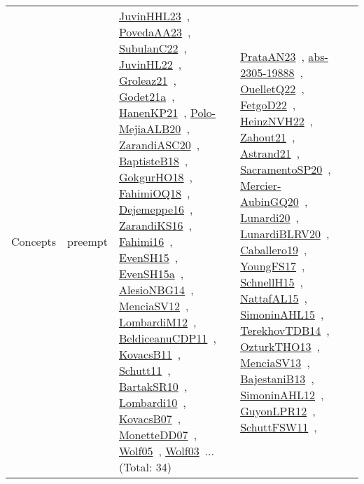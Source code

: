 {\begin{longtable}{lp{3cm}>{\raggedright\arraybackslash}p{6cm}>{\raggedright\arraybackslash}p{6cm}>{\raggedright\arraybackslash}p{8cm}}
Concepts & preempt & \href{works/JuvinHHL23.pdf}{JuvinHHL23}~\cite{JuvinHHL23}, \href{works/PovedaAA23.pdf}{PovedaAA23}~\cite{PovedaAA23}, \href{works/SubulanC22.pdf}{SubulanC22}~\cite{SubulanC22}, \href{works/JuvinHL22.pdf}{JuvinHL22}~\cite{JuvinHL22}, \href{works/Groleaz21.pdf}{Groleaz21}~\cite{Groleaz21}, \href{works/Godet21a.pdf}{Godet21a}~\cite{Godet21a}, \href{works/HanenKP21.pdf}{HanenKP21}~\cite{HanenKP21}, \href{works/Polo-MejiaALB20.pdf}{Polo-MejiaALB20}~\cite{Polo-MejiaALB20}, \href{works/ZarandiASC20.pdf}{ZarandiASC20}~\cite{ZarandiASC20}, \href{works/BaptisteB18.pdf}{BaptisteB18}~\cite{BaptisteB18}, \href{works/GokgurHO18.pdf}{GokgurHO18}~\cite{GokgurHO18}, \href{works/FahimiOQ18.pdf}{FahimiOQ18}~\cite{FahimiOQ18}, \href{works/Dejemeppe16.pdf}{Dejemeppe16}~\cite{Dejemeppe16}, \href{works/ZarandiKS16.pdf}{ZarandiKS16}~\cite{ZarandiKS16}, \href{works/Fahimi16.pdf}{Fahimi16}~\cite{Fahimi16}, \href{works/EvenSH15.pdf}{EvenSH15}~\cite{EvenSH15}, \href{works/EvenSH15a.pdf}{EvenSH15a}~\cite{EvenSH15a}, \href{works/AlesioNBG14.pdf}{AlesioNBG14}~\cite{AlesioNBG14}, \href{works/MenciaSV12.pdf}{MenciaSV12}~\cite{MenciaSV12}, \href{works/LombardiM12.pdf}{LombardiM12}~\cite{LombardiM12}, \href{works/BeldiceanuCDP11.pdf}{BeldiceanuCDP11}~\cite{BeldiceanuCDP11}, \href{works/KovacsB11.pdf}{KovacsB11}~\cite{KovacsB11}, \href{works/Schutt11.pdf}{Schutt11}~\cite{Schutt11}, \href{works/BartakSR10.pdf}{BartakSR10}~\cite{BartakSR10}, \href{works/Lombardi10.pdf}{Lombardi10}~\cite{Lombardi10}, \href{works/KovacsB07.pdf}{KovacsB07}~\cite{KovacsB07}, \href{works/MonetteDD07.pdf}{MonetteDD07}~\cite{MonetteDD07}, \href{works/Wolf05.pdf}{Wolf05}~\cite{Wolf05}, \href{works/Wolf03.pdf}{Wolf03}~\cite{Wolf03}... (Total: 34) & \href{works/PrataAN23.pdf}{PrataAN23}~\cite{PrataAN23}, \href{works/abs-2305-19888.pdf}{abs-2305-19888}~\cite{abs-2305-19888}, \href{works/OuelletQ22.pdf}{OuelletQ22}~\cite{OuelletQ22}, \href{works/FetgoD22.pdf}{FetgoD22}~\cite{FetgoD22}, \href{works/HeinzNVH22.pdf}{HeinzNVH22}~\cite{HeinzNVH22}, \href{works/Zahout21.pdf}{Zahout21}~\cite{Zahout21}, \href{works/Astrand21.pdf}{Astrand21}~\cite{Astrand21}, \href{works/SacramentoSP20.pdf}{SacramentoSP20}~\cite{SacramentoSP20}, \href{works/Mercier-AubinGQ20.pdf}{Mercier-AubinGQ20}~\cite{Mercier-AubinGQ20}, \href{works/Lunardi20.pdf}{Lunardi20}~\cite{Lunardi20}, \href{works/LunardiBLRV20.pdf}{LunardiBLRV20}~\cite{LunardiBLRV20}, \href{works/Caballero19.pdf}{Caballero19}~\cite{Caballero19}, \href{works/YoungFS17.pdf}{YoungFS17}~\cite{YoungFS17}, \href{works/SchnellH15.pdf}{SchnellH15}~\cite{SchnellH15}, \href{works/NattafAL15.pdf}{NattafAL15}~\cite{NattafAL15}, \href{works/SimoninAHL15.pdf}{SimoninAHL15}~\cite{SimoninAHL15}, \href{works/TerekhovTDB14.pdf}{TerekhovTDB14}~\cite{TerekhovTDB14}, \href{works/OzturkTHO13.pdf}{OzturkTHO13}~\cite{OzturkTHO13}, \href{works/MenciaSV13.pdf}{MenciaSV13}~\cite{MenciaSV13}, \href{works/BajestaniB13.pdf}{BajestaniB13}~\cite{BajestaniB13}, \href{works/SimoninAHL12.pdf}{SimoninAHL12}~\cite{SimoninAHL12}, \href{works/GuyonLPR12.pdf}{GuyonLPR12}~\cite{GuyonLPR12}, \href{works/SchuttFSW11.pdf}{SchuttFSW11}~\cite{SchuttFSW11}, 
\end{longtable}}
